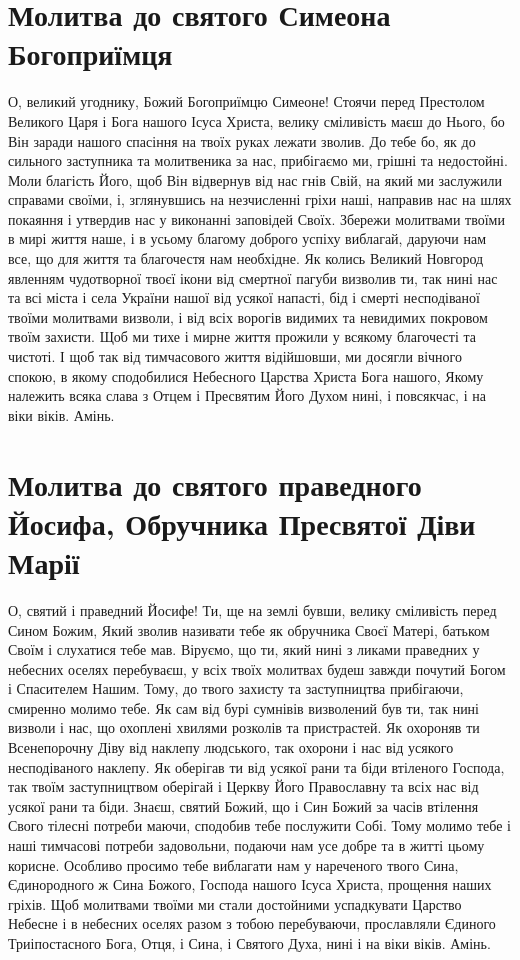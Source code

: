 \documentclass[chapters.tex]{subfiles}
\begin{document}
\section{Молитва до святого Симеона Богоприїмця}
О, великий угоднику, Божий Богоприїмцю Симеоне! Стоячи перед Престолом Великого Царя і Бога нашого Ісуса Христа, велику сміливість маєш до Нього, бо Він заради нашого спасіння на твоїх руках лежати зволив. До тебе бо, як до сильного заступника та молитвеника за нас, прибігаємо ми, грішні та недостойні. Моли благість Його, щоб Він відвернув від нас гнів Свій, на який ми заслужили справами своїми, і, зглянувшись на незчисленні гріхи наші, направив нас на шлях покаяння і утвердив нас у виконанні заповідей Своїх. Збережи молитвами твоїми в мирі життя наше, і в усьому благому доброго успіху виблагай, даруючи нам все, що для життя та благочестя нам необхідне. Як колись Великий Новгород явленням чудотворної твоєї ікони від смертної пагуби визволив ти, так нині нас та всі міста і села України нашої від усякої напасті, бід і смерті несподіваної твоїми молитвами визволи, і від всіх ворогів видимих та невидимих покровом твоїм захисти. Щоб ми тихе і мирне життя прожили у всякому благочесті та чистоті. І щоб так від тимчасового життя відійшовши, ми досягли вічного спокою, в якому сподобилися Небесного Царства Христа Бога нашого, Якому належить всяка слава з Отцем і Пресвятим Його Духом нині, і повсякчас, і на віки віків. Амінь.

\section{Молитва до святого праведного Йосифа, Обручника Пресвятої Діви Марії}
О, святий і праведний Йосифе! Ти, ще на землі бувши, велику сміливість перед Сином Божим, Який зволив називати тебе як обручника Своєї Матері, батьком Своїм і слухатися тебе мав. Віруємо, що ти, який нині з ликами праведних у небесних оселях перебуваєш, у всіх твоїх молитвах будеш завжди почутий Богом і Спасителем Нашим. Тому, до твого захисту та заступництва прибігаючи, смиренно молимо тебе. Як сам від бурі сумнівів визволений був ти, так нині визволи і нас, що охоплені хвилями розколів та пристрастей. Як охороняв ти Всенепорочну Діву від наклепу людського, так охорони і нас від усякого несподіваного наклепу. Як оберігав ти від усякої рани та біди втіленого Господа, так твоїм заступництвом оберігай і Церкву Його Православну та всіх нас від усякої рани та біди. Знаєш, святий Божий, що і Син Божий за часів втілення Свого тілесні потреби маючи, сподобив тебе послужити Собі. Тому молимо тебе і наші тимчасові потреби задовольни, подаючи нам усе добре та в житті цьому корисне. Особливо просимо тебе виблагати нам у нареченого твого Сина, Єдинородного ж Сина Божого, Господа нашого Ісуса Христа, прощення наших гріхів. Щоб молитвами твоїми ми стали достойними успадкувати Царство Небесне і в небесних оселях разом з тобою перебуваючи, прославляли Єдиного Триіпостасного Бога, Отця, і Сина, і Святого Духа, нині і на віки віків. Амінь.
\end{document}
